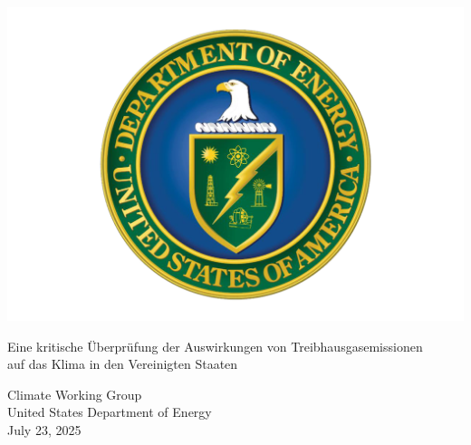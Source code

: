 \documentclass[12pt,paper=a4,DIV=12,parskip=never,chapterprefix=false,headings=standardclasses]{scrreprt}
\numberwithin{figure}{chapter}
\begin{document}
\begin{titlepage}
\centering
\vspace*{-0.5cm}
\includegraphics[width=1.0\textwidth]{bilder/bilderKlima-0000.png}\\[1cm]

{\huge Eine kritische Überprüfung der Auswirkungen von Treibhausgasemissionen\\
auf das Klima in den Vereinigten Staaten\par}
\vfill
\begin{flushleft}
\Large
Climate Working Group\\
United States Department of Energy\\
July 23, 2025
\end{flushleft}
\vfill
\end{titlepage}

\newpage
\thispagestyle{empty}
\mbox{}
\newpage
\end{document}
